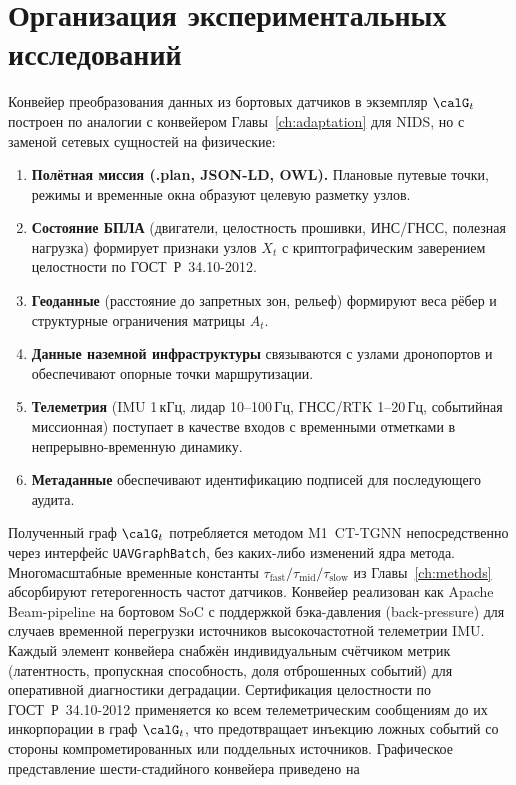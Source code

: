 \section{Организация экспериментальных исследований}
\label{sec:uav_pipeline}
Конвейер преобразования данных из бортовых датчиков в экземпляр
$\calG_t$ построен по аналогии с конвейером Главы~\ref{ch:adaptation}
для NIDS, но с заменой сетевых сущностей на физические:
\begin{enumerate}\setlength\itemsep{0.15em}
\item \textbf{Полётная миссия (.plan, JSON-LD, OWL).} Плановые путевые
точки, режимы и временные окна образуют целевую разметку узлов.
\item \textbf{Состояние БПЛА} (двигатели, целостность прошивки,
ИНС/ГНСС, полезная нагрузка) формирует признаки узлов $X_t$ с
криптографическим заверением целостности по \mbox{ГОСТ~Р~34.10-2012}.
\item \textbf{Геоданные} (расстояние до запретных зон, рельеф)
формируют веса рёбер и структурные ограничения матрицы $A_t$.
\item \textbf{Данные наземной инфраструктуры} связываются с узлами
дронопортов и обеспечивают опорные точки маршрутизации.
\item \textbf{Телеметрия} (IMU 1\,кГц, лидар 10--100\,Гц, ГНСС/RTK
1--20\,Гц, событийная миссионная) поступает в качестве входов с
временными отметками в непрерывно-временную динамику.
\item \textbf{Метаданные} обеспечивают идентификацию подписей для
последующего аудита.
\end{enumerate}
Полученный граф $\calG_t$ потребляется методом \textsf{M1~CT-TGNN}
непосредственно через интерфейс \texttt{UAVGraphBatch}, без
каких-либо изменений ядра метода. Многомасштабные временные константы
$\tau_{\mathrm{fast}}/\tau_{\mathrm{mid}}/\tau_{\mathrm{slow}}$ из
Главы~\ref{ch:methods} абсорбируют гетерогенность частот датчиков.
Конвейер реализован как Apache Beam-pipeline на бортовом SoC с
поддержкой бэка-давления (back-pressure) для случаев временной
перегрузки источников высокочастотной телеметрии IMU. Каждый
элемент конвейера снабжён индивидуальным счётчиком метрик
(латентность, пропускная способность, доля отброшенных событий)
для оперативной диагностики деградации. Сертификация целостности
по \mbox{ГОСТ~Р~34.10-2012} применяется ко всем телеметрическим
сообщениям до их инкорпорации в граф $\calG_t$, что предотвращает
инъекцию ложных событий со стороны компрометированных или
поддельных источников.
Графическое представление шести-стадийного конвейера приведено на
